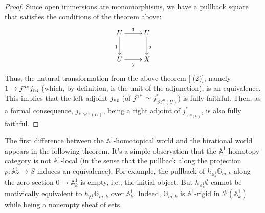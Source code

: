     \begin{proof}
        Since open immersions are monomorphisms, we have a pullback square that satisfies the conditions of the theorem above:   
        \[
    \xymatrix{
    U\ar[r]^{1}\ar[d]_{1}&U\ar[d]^{j}\\
    U \ar[r]_{j}&X
    }
    \]
    Thus, the natural transformation from the above theorem [ (2)], namely $1\to j^{n*}j_{n{\mathord{\text{\tiny $\sharp$}}}} $ (which, by definition, is the unit of the adjunction), is an equivalence. This implies that the left adjoint $j_{n{\mathord{\text{\tiny $\sharp$}}}} $ (of $j^{n*}\simeq j^*_{|\mathcal{H}^n(U)}$) is fully faithful. Then, as a formal consequence, ${j_{*}}_{|\mathcal{H}^n(U)}$, being a right adjoint of $j^*_{_{|\mathcal{H}^n(U)}}$, is also fully faithful.
\end{proof}
    

    The first difference between the $\mathbb{A}^1$-homotopical world and the birational world appears in the following theorem. It's a simple observation that the $\mathbb{A}^1$-homotopy category is not $\mathbb{A}^1$-local (in the sense that the pullback along the projection $p:\mathbb{A}^1_S\to S$ induces an equivalence). For example, the pullback of $h_{\mathbb{A}_k^1}\mathbb{G}_{m,k}$ along the zero section $0\to \mathbb{A}^1_k$ is empty, i.e., the initial object. But $h_{\mathbb{A}^1_k}\emptyset$ cannot be motivically equivalent to $h_{\mathbb{A}^1}\mathbb{G}_{m,k}$ over $\mathbb{A}^1_k$. Indeed, $\mathbb{G}_{m,k}$ is $\mathbb{A}^1$-rigid in $\mathcal{P}(\mathbb{A}^1_k)$ while being a nonempty sheaf of sets. 
  \vspace{.4cm}  

